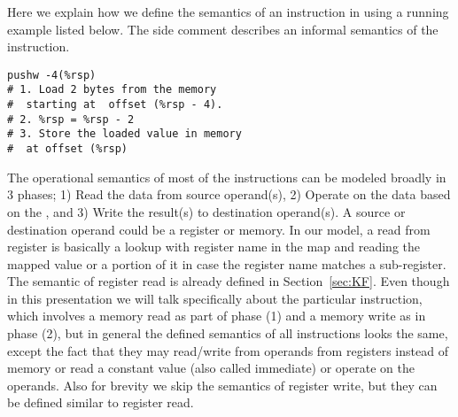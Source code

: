 Here we explain how we define the semantics of an instruction in \K using a running example listed below. The side comment describes an informal semantics of the instruction. 
\begin{lstlisting}[style=Bash,label={lst:CS4}]
pushw -4(%rsp)  
# 1. Load 2 bytes from the memory 
#  starting at  offset (%rsp - 4).
# 2. %rsp = %rsp - 2 
# 3. Store the loaded value in memory
#  at offset (%rsp)

\end{lstlisting}

   The operational semantics of most of the instructions can be modeled broadly in $3$ phases; 1) Read the data from source operand(s), 2) Operate on the data based on the , and 3) Write the result(s) to destination operand(s). A source or destination operand could be a register or memory. In our model, a read from register is basically a lookup with register name in the  map and reading the mapped value or a portion of it in case the register name matches a sub-register. The semantic of register read is already defined in Section~\ref{sec:KF}.  Even though in this presentation we will talk specifically about the particular instruction, which involves a memory read as part of phase (1) and a memory write as in phase (2), but in general the defined semantics of  all instructions looks the same, except the fact that they may read/write from operands from registers instead of memory or read a constant value (also called immediate) or operate on the operands. Also for brevity we skip the semantics of  register write, but they can be defined similar to register read.     

